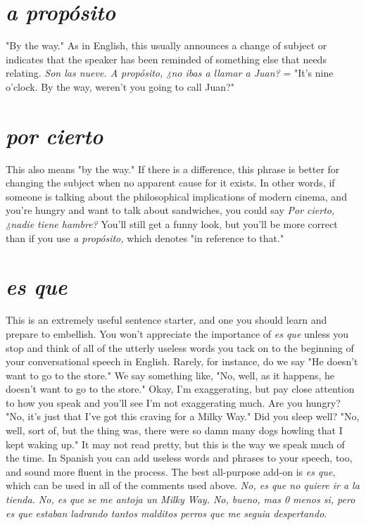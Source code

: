 \documentclass[14pt,a4paper,oneside]{memoir}
\begin{document}
\section{\emph{a propósito}}

"By the way." As in English, this usually announces a change
of subject or indicates that the speaker has been reminded of something else that needs relating. \emph{Son las nueve. A propósito, ¿no ibas a
llamar a Juan?} = "It's nine o'clock. By the way, weren't you going to
call Juan?"

\section{\emph{por cierto}}

This also means "by the way." If there is a difference, this
phrase is better for changing the subject when no apparent cause for
it exists. In other words, if someone is talking about the philosophical
implications of modern cinema, and you're hungry and want to talk
about sandwiches, you could say \emph{Por cierto, ¿nadie tiene hambre?}
You'll still get a funny look, but you'll be more correct than if you use
\emph{a propósito,} which denotes "in reference to that."

\section{\emph{es que}}

This is an extremely useful sentence starter, and one you
should learn and prepare to embellish. You won't appreciate the importance of \emph{es que} unless you stop and think of all of the utterly useless
words you tack on to the beginning of your conversational speech in
English. Rarely, for instance, do we say "He doesn't want to go to the
store." We say something like, "No, well, as it happens, he doesn't
want to go to the store." Okay, I'm exaggerating, but pay close attention to how you speak and you'll see I'm not exaggerating much. Are
you hungry? "No, it's just that I've got this craving for a Milky Way."
Did you sleep well? "No, well, sort of, but the thing was, there were
so damn many dogs howling that I kept waking up." It may not read
pretty, but this is the way we speak much of the time. In Spanish you
can add useless words and phrases to your speech, too, and sound more
fluent in the process. The best all-purpose add-on is \emph{es que}, which can
be used in all of the comments used above. \emph{No, es que no quiere ir a
la tienda. No, es que se me antoja un Milky Way. No, bueno, mas 0
menos si, pero es que estaban ladrando tantos malditos perros que
me seguia despertando}.
\end{document}
